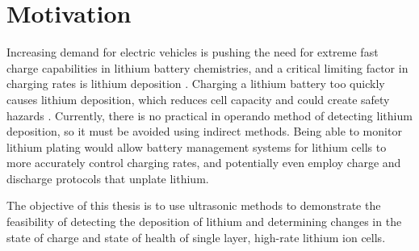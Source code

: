 \section{Motivation}
Increasing demand for electric vehicles is pushing the need for extreme fast charge capabilities in lithium battery chemistries, and a critical limiting factor in charging rates is lithium deposition \cite{XFC}. Charging a lithium battery too quickly causes lithium deposition, which reduces cell capacity and could create safety hazards \cite{XFC}. Currently, there is no practical in operando method of detecting lithium deposition, so it must be avoided using indirect methods. Being able to monitor lithium plating would allow battery management systems for lithium cells to more accurately control charging rates, and potentially even employ charge and discharge protocols that unplate lithium.

The objective of this thesis is to use ultrasonic methods to demonstrate the feasibility of detecting the deposition of lithium and determining changes in the state of charge and state of health of single layer, high-rate lithium ion cells.